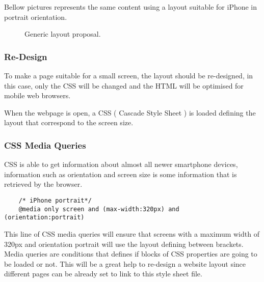 Bellow pictures represents the same content using a layout suitable for iPhone in portrait orientation.

\begin{figure}[h!]

\caption{Generic layout proposal.}
\end{figure}

\subsubsection{Re-Design}

To make a page suitable for a small screen, the layout should be re-designed, in this case, only the CSS will be changed and the HTML will be optimised for mobile web browsers.

When the webpage is open, a CSS ( Cascade Style Sheet ) is loaded defining the layout that correspond to the screen size.

\subsubsection{CSS Media Queries}  %

CSS is able to get information about almost all newer smartphone devices, information such as orientation and screen size is some information that is retrieved by the browser.

\begin{lstlisting}
	/* iPhone portrait*/
	@media only screen and (max-width:320px) and (orientation:portrait)
\end{lstlisting}

This line of CSS media queries will ensure that screens with a maximum width of 320px and orientation portrait will use the layout defining between brackets. Media queries are conditions that defines if blocks of CSS properties are going to be loaded or not. This will be a great help to re-design a website layout since different pages can be already set to link to this style sheet file. \\

